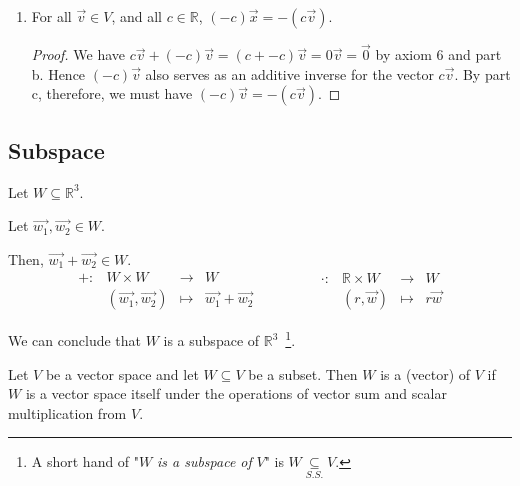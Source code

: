 \documentclass[11pt,fleqn]{book} %
\begin{document}
\begin{proposition}
\begin{enumerate}[label=\alph*)]
        \item For all $\overrightarrow{v} \in V$, and all $c \in \mathbb{R}$, $(-c)\overrightarrow{x}  = -(c\overrightarrow{v})$.
        \begin{proof}
            We have $c\overrightarrow{v} + (-c)\overrightarrow{v} = (c + -c)\overrightarrow{v} = 0\overrightarrow{v} = \overrightarrow{0}$ by axiom 6 and part b. Hence $(-c)\overrightarrow{v}$ also serves as an additive inverse for the vector $c\overrightarrow{v}$. By part c, therefore, we must have $(-c)\overrightarrow{v} = -(c\overrightarrow{v})$.
        \end{proof}
    \end{enumerate}
\end{proposition}
\setcounter{section}{3}

\subsection{Subspace}
\begin{example}
    Let $W \subseteq \mathbb{R}^3$. 
    
    Let $\overrightarrow{w_1}, \overrightarrow{w_2} \in W$. 
    
    Then, $\overrightarrow{w_1} + \overrightarrow{w_2} \in W$. 
    $$
        \begin{matrix} +: &W\times W &\to &W \\ &(\overrightarrow{w_1}, \overrightarrow{w_2}) &\mapsto &\overrightarrow{w_1} + \overrightarrow{w_2} \end{matrix} 
        \qquad \qquad 
        \begin{matrix} \cdot: &\mathbb{R} \times W &\to &W \\ &(r, \overrightarrow{w}) &\mapsto &r\overrightarrow{w} \end{matrix}
    $$
    
    We can conclude that $W$ is a subspace of $\mathbb{R}^3$~\footnote{A short hand of "$W$ \textit{is a subspace of} $V$" is $W \underset{S.S.}{\subseteq} V$. }. 
\end{example}

\setcounter{section}{2}
\setcounter{definitionT}{5}
\begin{definition}[Subspace]
    Let $V$ be a vector space and let $W \subseteq V$ be a  subset. Then $W$ is a (vector)  of $V$ if $W$ is a vector space itself under the operations of vector sum and scalar multiplication from $V$.
\end{definition}
\setcounter{section}{3}
\end{document}

